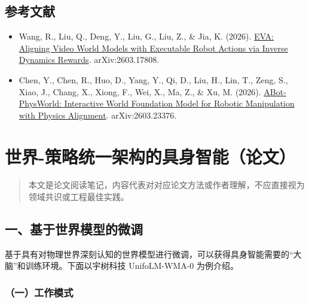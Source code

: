 \hypertarget{ux53c2ux8003ux6587ux732e-205}{%
\subsection{参考文献}\label{ux53c2ux8003ux6587ux732e-205}}

\begin{itemize}
\tightlist
\item
  Wang, R., Liu, Q., Deng, Y., Liu, G., Liu, Z., \& Jia, K. (2026). \href{https://arxiv.org/abs/2603.17808}{EVA: Aligning Video World Models with Executable Robot Actions via Inverse Dynamics Rewards}. arXiv:2603.17808.
\item
  Chen, Y., Chen, R., Huo, D., Yang, Y., Qi, D., Liu, H., Lin, T., Zeng, S., Xiao, J., Chang, X., Xiong, F., Wei, X., Ma, Z., \& Xu, M. (2026). \href{https://arxiv.org/abs/2603.23376}{ABot-PhysWorld: Interactive World Foundation Model for Robotic Manipulation with Physics Alignment}. arXiv:2603.23376.
\end{itemize}

\clearpage

\hypertarget{ux4e16ux754c-ux7b56ux7565ux7edfux4e00ux67b6ux6784ux7684ux5177ux8eabux667aux80fdux8bbaux6587}{%
\section{世界-策略统一架构的具身智能（论文）}\label{ux4e16ux754c-ux7b56ux7565ux7edfux4e00ux67b6ux6784ux7684ux5177ux8eabux667aux80fdux8bbaux6587}}

\begin{quote}
本文是论文阅读笔记，内容代表对对应论文方法或作者理解，不应直接视为领域共识或工程最佳实践。
\end{quote}

\hypertarget{ux4e00ux57faux4e8eux4e16ux754cux6a21ux578bux7684ux5faeux8c03}{%
\subsection{一、基于世界模型的微调}\label{ux4e00ux57faux4e8eux4e16ux754cux6a21ux578bux7684ux5faeux8c03}}

基于具有对物理世界深刻认知的世界模型进行微调，可以获得具身智能需要的``大脑''和训练环境。下面以宇树科技 UnifoLM-WMA-0 为例介绍。

\hypertarget{ux4e00ux5de5ux4f5cux6a21ux5f0f}{%
\subsubsection{（一）工作模式}\label{ux4e00ux5de5ux4f5cux6a21ux5f0f}}

